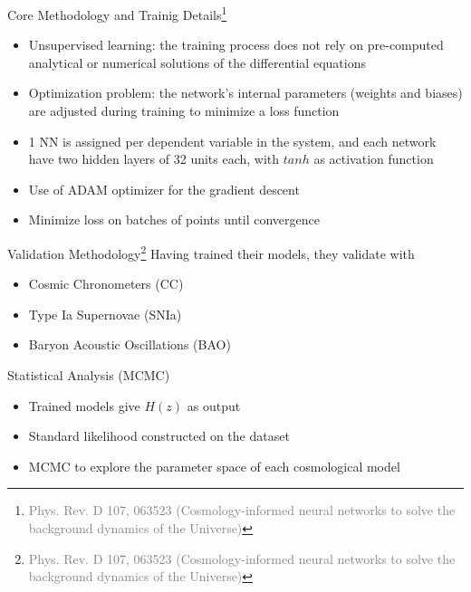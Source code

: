 \documentclass[aspectratio=169, 12pt]{beamer}
\newcommand{\gray}[1]{\textcolor{gray}{#1}}
\begin{document}
\begin{frame}{Core Methodology and Trainig Details\footnote{\tiny{\gray{Phys. Rev. D 107, 063523 (Cosmology-informed neural networks to solve the background dynamics of the Universe)}}}}
\begin{itemize}
	\item Unsupervised learning: \alert{the training process does not rely on pre-computed analytical or numerical solutions of the differential equations}\pause
	\item Optimization problem: \alert{the network's internal parameters (weights and biases) are adjusted during training to minimize a loss function}\pause
	\item 1 NN is assigned per dependent variable in the system, and \alert{each network have two hidden layers of 32 units each}, with $tanh$ as activation function\pause
	\item Use of \alert{ADAM optimizer} for the gradient descent\pause
	\item \alert{Minimize loss on batches of points until convergence}
\end{itemize}
\end{frame}
\begin{frame}{Validation Methodology\footnote{\tiny{\gray{Phys. Rev. D 107, 063523 (Cosmology-informed neural networks to solve the background dynamics of the Universe)}}}}
Having trained their models, they validate with
\begin{itemize}
	\item Cosmic Chronometers (CC)\pause
	\item Type Ia Supernovae (SNIa)\pause
	\item Baryon Acoustic Oscillations (BAO)\pause
\end{itemize}
Statistical Analysis \alert{(MCMC)}
\begin{itemize}
	\item Trained models give $H(z)$ as output\pause
	\item Standard likelihood constructed on the dataset\pause
	\item MCMC to explore the parameter space of each cosmological model
\end{itemize}
\end{frame}
\end{document}
